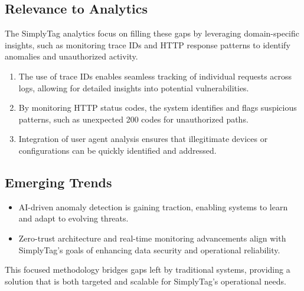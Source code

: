 \subsection{Relevance to Analytics}

The SimplyTag analytics focus on filling these gaps by leveraging domain-specific insights, such as monitoring trace IDs and HTTP response patterns to identify anomalies and unauthorized activity.

\begin{enumerate}
	\item The use of trace IDs enables seamless tracking of individual requests across logs, allowing for detailed insights into potential vulnerabilities.
	\item By monitoring HTTP status codes, the system identifies and flags suspicious patterns, such as unexpected 200 codes for unauthorized paths.
	\item Integration of user agent analysis ensures that illegitimate devices or configurations can be quickly identified and addressed.
\end{enumerate}

\subsection{Emerging Trends}
\begin{itemize}
	\item AI-driven anomaly detection is gaining traction, enabling systems to learn and adapt to evolving threats.
	\item Zero-trust architecture and real-time monitoring advancements align with SimplyTag’s goals of enhancing data security and operational reliability.
\end{itemize}

This focused methodology bridges gaps left by traditional systems, providing a solution that is both targeted and scalable for SimplyTag’s operational needs.
